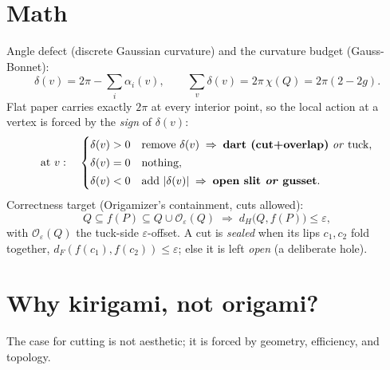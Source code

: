 \documentclass[11pt]{article}
\newcommand{\eps}{\varepsilon}
\newcommand{\defect}{\delta}
\newcommand{\Off}{\mathcal{O}_{\eps}}
\begin{document}
\section{Math}
Angle defect (discrete Gaussian curvature) and the curvature budget
(Gauss-Bonnet):
\begin{equation}
\defect(v)=2\pi-\sum_i\alpha_i(v),
\qquad
\sum_{v}\defect(v)=2\pi\,\chi(Q)=2\pi(2-2g).
\label{eq:gb}
\end{equation}
Flat paper carries exactly $2\pi$ at every interior point, so the local
action at a vertex is forced by the \emph{sign} of $\defect(v)$:
\begin{equation}
\text{at } v:\quad
\begin{cases}
\defect(v)>0 & \text{remove } \defect(v) \;\Rightarrow\; \textbf{dart (cut+overlap)} \text{ \emph{or} tuck},\\[2pt]
\defect(v)=0 & \text{nothing},\\[2pt]
\defect(v)<0 & \text{add } |\defect(v)| \;\Rightarrow\; \textbf{open slit \emph{or} gusset}.
\end{cases}
\label{eq:rule}
\end{equation}
Correctness target (Origamizer's containment, cuts allowed):
\begin{equation}
Q\subseteq f(P)\subseteq Q\cup\Off(Q)
\;\Longrightarrow\;
d_H\!\big(Q,f(P)\big)\le\eps,
\label{eq:target}
\end{equation}
with $\Off(Q)$ the tuck-side $\eps$-offset. A cut is \emph{sealed} when its
lips $c_1,c_2$ fold together, $d_F(f(c_1),f(c_2))\le\eps$; else it is left
\emph{open} (a deliberate hole).

\section{Why kirigami, not origami?}\label{sec:why}
The case for cutting is not aesthetic; it is forced by geometry, efficiency,
and topology.
\end{document}
